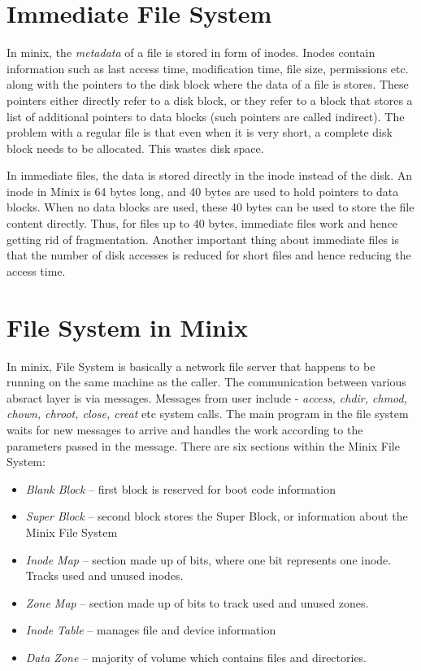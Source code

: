 \section {Immediate File System}

In minix, the \emph{metadata} of a file is stored in form of inodes.
Inodes contain information such as last access time, modification time, file
size, permissions etc. along with the pointers to the disk block where the data of a file is stores.
These pointers either directly refer to a disk block,
or they refer to a block that stores a list of additional pointers to data blocks
(such pointers are called indirect). 
The problem with a regular file is that even when it is very short,
a complete disk block needs to be allocated. This wastes disk space.

In immediate files, the data is stored directly in the inode instead of the
disk. An inode in Minix is 64 bytes long, and 40 bytes are used to hold pointers to data blocks.
When no data blocks are used, these 40 bytes can be used to store the file
content directly.
Thus, for files up to 40 bytes, immediate files work and hence getting rid of
fragmentation.
 Another important thing about immediate files is that the number
of disk accesses is reduced for short files and hence reducing the access time.
 

\section{File System in Minix}
In minix, File System is basically a network file server that happens to be running on the same machine as the caller.
The communication between various absract layer is via messages.
Messages from user include - \emph{access, chdir, chmod, chown, chroot, close, creat} etc system calls.
The main program in the file system waits for new messages to arrive and handles
the work according to the parameters passed in the message. There are  six sections within the Minix File System:
\begin{itemize}
\item \emph{Blank Block} – first block is reserved for boot code information
\item \emph{Super Block} – second block stores the Super Block, or information about the Minix File System
\item \emph{Inode Map} – section made up of bits, where one bit represents one inode. Tracks used and unused inodes.
\item \emph{Zone Map} – section made up of bits to track used and unused zones. %
\item \emph{Inode Table} – manages file and device information
\item \emph{Data Zone} – majority of volume which contains files and directories.
\end{itemize}

